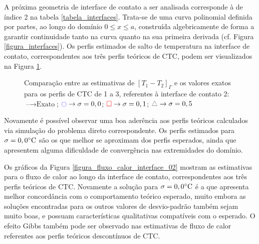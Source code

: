 A próxima geometria de interface de contato a ser analisada corresponde à de índice 2 na tabela \ref{tabela_interfaces}. Trata-se de uma curva polinomial definida por partes, ao longo do domínio $0 \le x \le a$, construída algebricamente de forma a garantir continuidade tanto na curva quanto na sua primeira derivada (cf. Figura \ref{figura_interfaces}). Os perfis estimados de salto de temperatura na interface de contato, correspondentes aos três perfis teóricos de CTC, podem ser visualizados na Figura \ref{figura_delta_temperaturas_interface_02}.
\begin{figure}[H]
	\caption{Comparação entre as estimativas de $[T_1 - T_2]_\Gamma$ e os valores exatos para os perfis de CTC de 1 a 3, referentes à interface de contato 2: $\text{--} \rightarrow \text{Exato}$; $\textcolor{blue}{\ocircle} \rightarrow \sigma = 0,0$; $\textcolor{red}{\square} \rightarrow \sigma = 0,1$; $\textcolor{gray}{\triangle} \rightarrow \sigma = 0,5$}
	\label{figura_delta_temperaturas_interface_02}
\end{figure}

Novamente é possível observar uma boa aderência aos perfis teóricos calculados via simulação do problema direto correspondente. Os perfis estimados para $\sigma = 0,0\celsius$ são os que melhor se aproximam dos perfis esperados, ainda que apresentem alguma dificuldade de convergência nas extremidades do domínio.

Os gráficos da Figura \ref{figura_fluxo_calor_interface_02} mostram as estimativas para o fluxo de calor ao longo da interface de contato, correspondentes aos três perfis teóricos de CTC. Novamente a solução para $\sigma = 0,0\celsius$ é a que apresenta melhor concordância com o comportamento teórico esperado, muito embora as soluções encontradas para os outros valores de desvio-padrão também sejam muito boas, e possuam características qualitativas compatíveis com o esperado. O efeito Gibbs também pode ser observado nas estimativas de fluxo de calor referentes aos perfis teóricos descontínuos de CTC.


